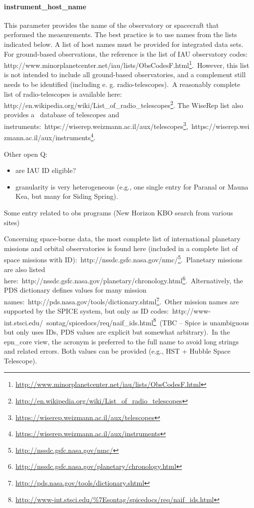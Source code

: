 \documentclass[11pt,a4paper]{ivoa}
\begin{document}
\paragraph{instrument\_host\_name}

This parameter provides the name of the observatory or spacecraft that performed the measurements. The best practice is to use names from the lists indicated below. A list of host names must be provided for integrated data sets. For ground-based observations, the reference is the list of IAU observatory codes: http://www.minorplanetcenter.net/iau/lists/ObsCodesF.html\footnote{\url{http://www.minorplanetcenter.net/iau/lists/ObsCodesF.html}}. However, this list is not intended to include all ground-based observatories, and a complement still needs to be identified (including e. g. radio-telescopes). A reasonably complete list of radio-telescopes is available here: http://en.wikipedia.org/wiki/List\_of\_radio\_telescopes\footnote{\url{http://en.wikipedia.org/wiki/List\_of\_radio\_telescopes}}. The WiseRep list also provides a  database of telescopes and instruments: https://wiserep.weizmann.ac.il/aux/telescopes\footnote{\url{https://wiserep.weizmann.ac.il/aux/telescopes}}, https://wiserep.weizmann.ac.il/aux/instruments\footnote{\url{https://wiserep.weizmann.ac.il/aux/instruments}}. 

Other open Q:

\begin{itemize}
\item are IAU ID eligible?
\item granularity is very heterogeneous (e.g., one single entry for Paranal or Mauna Kea, but many for Siding Spring).
\end{itemize}

Some entry related to obs programs (New Horizon KBO search from various sites)

Concerning space-borne data, the most complete list of international planetary missions and orbital observatories is found here (included in a complete list of space missions with ID): http://nssdc.gsfc.nasa.gov/nmc/\footnote{\url{http://nssdc.gsfc.nasa.gov/nmc/}}. Planetary missions are also listed here: http://nssdc.gsfc.nasa.gov/planetary/chronology.html\footnote{\url{http://nssdc.gsfc.nasa.gov/planetary/chronology.html}}. Alternatively, the PDS dictionary defines values for many mission names: http://pds.nasa.gov/tools/dictionary.shtml\footnote{\url{http://pds.nasa.gov/tools/dictionary.shtml}}. Other mission names are supported by the SPICE system, but only as ID codes: http://www-int.stsci.edu/~sontag/spicedocs/req/naif\_ids.html\footnote{\url{http://www-int.stsci.edu/\%7Esontag/spicedocs/req/naif\_ids.html}} (TBC – Spice is unambiguous but only uses IDs, PDS values are explicit but somewhat arbitrary). In the epn\_core view, the acronym is preferred to the full name to avoid long strings and related errors. Both values can be provided (e.g., HST + Hubble Space Telescope).
\end{document}
